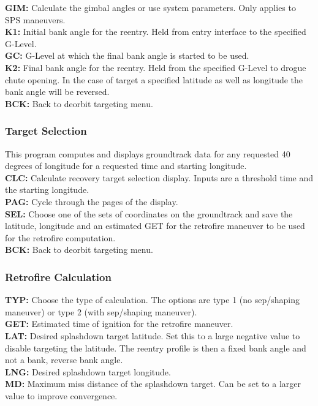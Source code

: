 \documentclass[11pt]{article} %
\begin{document}
\textbf{GIM:} Calculate the gimbal angles or use system parameters. Only applies to SPS maneuvers.\\
\textbf{K1:} Initial bank angle for the reentry. Held from entry interface to the specified G-Level.\\
\textbf{GC:} G-Level at which the final bank angle is started to be used.\\
\textbf{K2:} Final bank angle for the reentry. Held from the specified G-Level to drogue chute opening. In the case of target a specified latitude as well as longitude the bank angle will be reversed.\\
\textbf{BCK:} Back to deorbit targeting menu.\\

\subsubsection{Target Selection}

This program computes and displays groundtrack data for any requested 40 degrees of longitude for a requested time and starting longitude.\\

\textbf{CLC:} Calculate recovery target selection display. Inputs are a threshold time and the starting longitude.\\
\textbf{PAG:} Cycle through the pages of the display.\\
\textbf{SEL:} Choose one of the sets of coordinates on the groundtrack and save the latitude, longitude and an estimated GET for the retrofire maneuver to be used for the retrofire computation.\\
\textbf{BCK:} Back to deorbit targeting menu.\\

\subsubsection{Retrofire Calculation}

\textbf{TYP:} Choose the type of calculation. The options are type 1 (no sep/shaping maneuver) or type 2 (with sep/shaping maneuver).\\
\textbf{GET:} Estimated time of ignition for the retrofire maneuver.\\
\textbf{LAT:} Desired splashdown target latitude. Set this to a large negative value to disable targeting the latitude. The reentry profile is then a fixed bank angle and not a bank, reverse bank angle.\\
\textbf{LNG:} Desired splashdown target longitude.\\
\textbf{MD:} Maximum miss distance of the splashdown target. Can be set to a larger value to improve convergence.\\
\end{document}
